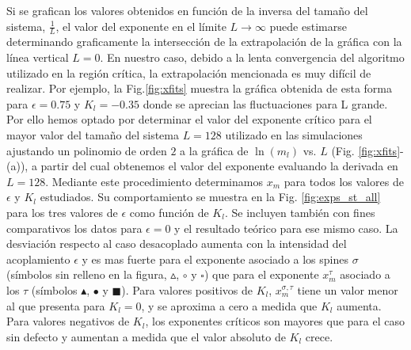 Si se grafican los valores obtenidos en funci\'on de la inversa del tamaño del sistema, $\frac{1}{L}$, el valor
del exponente en el l\'imite $L\rightarrow \infty$ puede estimarse determinando graficamente la intersecci\'on
de la extrapolaci\'on de la gr\'afica con la l\'inea vertical $L=0$. En nuestro caso, debido a la lenta convergencia
del algoritmo utilizado en la regi\'on cr\'itica, la extrapolaci\'on mencionada es muy dif\'icil de realizar. Por ejemplo, la Fig.\ref{fig:xfits}
muestra la gr\'afica obtenida de esta forma para $\epsilon=0.75$ y $K_{l}=-0.35$ donde se aprecian las fluctuaciones para L grande.
 Por ello hemos optado por determinar el
valor del exponente cr\'itico para el mayor valor del tamaño del sistema $L=128$ utilizado en las simulaciones ajustando un polinomio de orden $2$
a la gr\'afica de $\ln{(m_{l})}$ vs. $L$ (Fig. \ref{fig:xfits}-(a)), a partir del cual obtenemos el valor del exponente
evaluando la derivada en $L=128$. Mediante este procedimiento determinamos $x_{m}$ para todos los valores de $\epsilon$
y $K_{l}$ estudiados.
Su comportamiento se muestra en la Fig. \ref{fig:exps_st_all}
 para los tres valores de $\epsilon$ como funci\'on de $K_{l}$. Se incluyen
 tambi\'en con fines comparativos los datos para $\epsilon=0$ y el resultado te\'orico para ese mismo caso. La desviaci\'on
 respecto al caso desacoplado aumenta con la intensidad del acoplamiento $\epsilon$ y es mas fuerte para el exponente asociado
 a los spines $\sigma$ (s\'imbolos sin relleno en la figura, $\vartriangle$, $\circ$ y $\square$) que para el exponente $x_{m}^{\tau}$ asociado a los $\tau$
 (s\'imbolos $\blacktriangle$, $\bullet$ y $\blacksquare$).
Para valores positivos de $K_{l}$, $x_{m}^{\sigma,\tau}$ tiene un valor menor al que presenta para $K_{l}=0$, y se aproxima
 a cero a medida que $K_{l}$ aumenta.
Para valores negativos de $K_{l}$, los exponentes cr\'iticos son mayores que para el caso sin defecto y aumentan a medida que el
 valor absoluto de $K_{l}$ crece.\\
 
